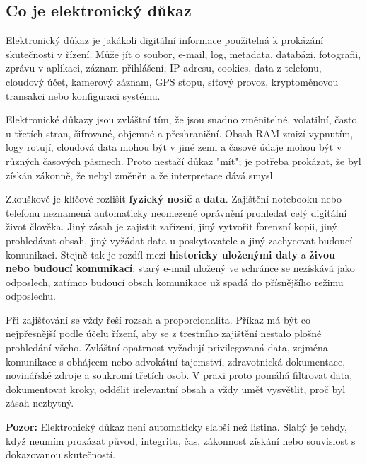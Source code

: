 \documentclass[11pt,a4paper]{article}
\newcommand{\pozor}[1]{\begin{tcolorbox}[breakable,enhanced,colback=red!7,colframe=red!30!black,boxrule=0pt,arc=1mm,left=5pt,right=5pt,top=5pt,bottom=5pt,before skip=6pt,after skip=6pt]\textbf{Pozor:} #1\end{tcolorbox}}
\begin{document}
\subsection*{Co je elektronický důkaz}
Elektronický důkaz je jakákoli digitální informace použitelná k prokázání skutečnosti v řízení. Může jít o soubor, e-mail, log, metadata, databázi, fotografii, zprávu v aplikaci, záznam přihlášení, IP adresu, cookies, data z telefonu, cloudový účet, kamerový záznam, GPS stopu, síťový provoz, kryptoměnovou transakci nebo konfiguraci systému.

Elektronické důkazy jsou zvláštní tím, že jsou snadno změnitelné, volatilní, často u třetích stran, šifrované, objemné a přeshraniční. Obsah RAM zmizí vypnutím, logy rotují, cloudová data mohou být v jiné zemi a časové údaje mohou být v různých časových pásmech. Proto nestačí důkaz "mít"; je potřeba prokázat, že byl získán zákonně, že nebyl změněn a že interpretace dává smysl.

Zkouškově je klíčové rozlišit \textbf{fyzický nosič} a \textbf{data}. Zajištění notebooku nebo telefonu neznamená automaticky neomezené oprávnění prohledat celý digitální život člověka. Jiný zásah je zajistit zařízení, jiný vytvořit forenzní kopii, jiný prohledávat obsah, jiný vyžádat data u poskytovatele a jiný zachycovat budoucí komunikaci. Stejně tak je rozdíl mezi \textbf{historicky uloženými daty} a \textbf{živou nebo budoucí komunikací}: starý e-mail uložený ve schránce se nezískává jako odposlech, zatímco budoucí obsah komunikace už spadá do přísnějšího režimu odposlechu.

Při zajišťování se vždy řeší rozsah a proporcionalita. Příkaz má být co nejpřesnější podle účelu řízení, aby se z trestního zajištění nestalo plošné prohledání všeho. Zvláštní opatrnost vyžadují privilegovaná data, zejména komunikace s obhájcem nebo advokátní tajemství, zdravotnická dokumentace, novinářské zdroje a soukromí třetích osob. V praxi proto pomáhá filtrovat data, dokumentovat kroky, oddělit irelevantní obsah a vždy umět vysvětlit, proč byl zásah nezbytný.

\pozor{Elektronický důkaz není automaticky slabší než listina. Slabý je tehdy, když neumím prokázat původ, integritu, čas, zákonnost získání nebo souvislost s dokazovanou skutečností.}
\end{document}
